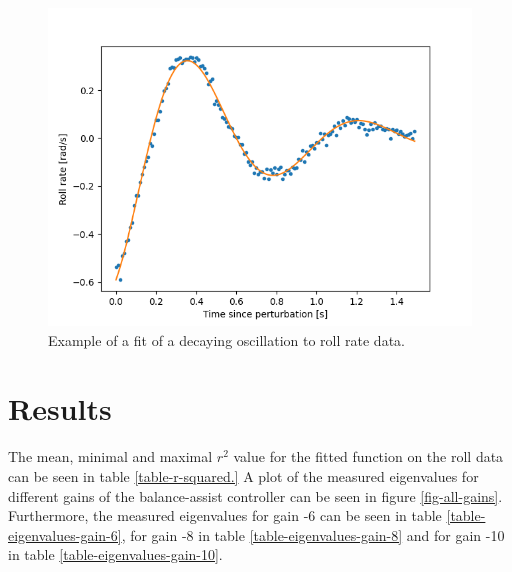 \documentclass[12pt]{article}
\begin{document}
\begin{figure}[h]
    \centering
    \includegraphics[width=\columnwidth]{figures/example_roll_rate_fit.png}
    \caption{Example of a fit of a decaying oscillation to roll rate data.} \label{example-roll-rate-fit}
\end{figure}

\section{Results}
The mean, minimal and maximal $r^2$ value for the fitted function on the roll data can be seen in
table \ref{table-r-squared.} A plot of the measured eigenvalues for different gains of the
balance-assist controller can be seen in figure \ref{fig-all-gains}. Furthermore, the measured
eigenvalues for gain -6 can be seen in table \ref{table-eigenvalues-gain-6}, for gain -8 in table
\ref{table-eigenvalues-gain-8} and for gain -10 in table \ref{table-eigenvalues-gain-10}.
\end{document}
